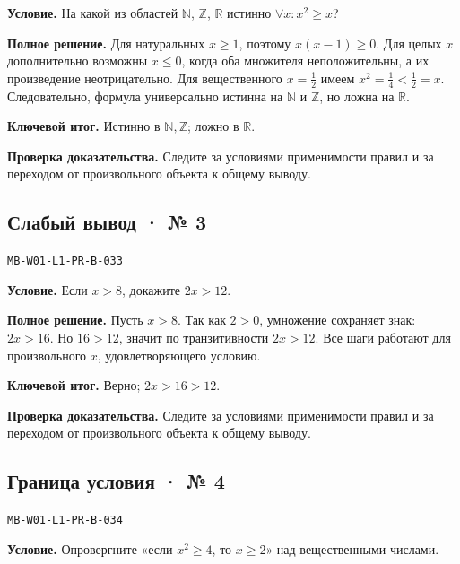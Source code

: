 \documentclass[11pt,a4paper,openany]{book}
\newcommand{\muid}[1]{\texttt{\footnotesize #1}}
\begin{document}
\textbf{Условие.} На какой из областей $\mathbb N$, $\mathbb Z$, $\mathbb R$ истинно $\forall x\colon x^2\ge x$?\par

\textbf{Полное решение.} Для натуральных $x\ge1$, поэтому $x(x-1)\ge0$. Для целых $x$ дополнительно возможны $x\le0$, когда оба множителя неположительны, а их произведение неотрицательно. Для вещественного $x=\tfrac12$ имеем $x^2=\tfrac14<\tfrac12=x$. Следовательно, формула универсально истинна на $\mathbb N$ и $\mathbb Z$, но ложна на $\mathbb R$.


\begin{learnbox}\textbf{Ключевой итог.} Истинно в $\mathbb N,\mathbb Z$; ложно в $\mathbb R$.\par \textbf{Проверка доказательства.} 
Следите за условиями применимости правил и за переходом от произвольного объекта к общему выводу. 
\end{learnbox}

\subsection*{Слабый вывод · № 3}\hypertarget{solution:MB-W01-L1-PR-B-033}{}

\muid{MB-W01-L1-PR-B-033}\par

\textbf{Условие.} Если $x>8$, докажите $2x>12$.\par

\textbf{Полное решение.} Пусть $x>8$. Так как $2>0$, умножение сохраняет знак: $2x>16$. Но $16>12$, значит по транзитивности $2x>12$. Все шаги работают для произвольного $x$, удовлетворяющего условию.


\begin{learnbox}\textbf{Ключевой итог.} Верно; $2x>16>12$.\par \textbf{Проверка доказательства.} 
Следите за условиями применимости правил и за переходом от произвольного объекта к общему выводу. 
\end{learnbox}

\subsection*{Граница условия · № 4}\hypertarget{solution:MB-W01-L1-PR-B-034}{}

\muid{MB-W01-L1-PR-B-034}\par

\textbf{Условие.} Опровергните «если $x^2\ge4$, то $x\ge2$» над вещественными числами.\par
\end{document}
